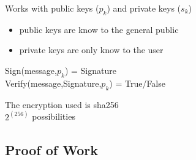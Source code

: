 \documentclass{beamer}
\begin{document}
\begin{frame}
    Works with public keys ($p_k$) and private keys ($s_k$)
    \pause
    \begin{itemize}
        \item public keys are know to the general public
            \pause
        \item private keys are only know to the user
            \pause
    \end{itemize}
    \begin{block}{}
        Sign(message,$p_k$) = Signature\\
        \pause
        Verify(message,Signature,$p_k$) = True/False
    \end{block}
    \pause
    The encryption used is sha256\\
    \pause
    $2^(256)$ possibilities
\end{frame}

\subsection{Proof of Work}

    
\end{document}
